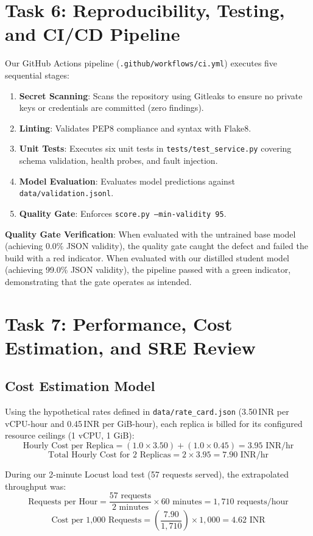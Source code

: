 \documentclass[10pt,a4paper]{article}
\begin{document}
\section{Task 6: Reproducibility, Testing, and CI/CD Pipeline}
Our GitHub Actions pipeline (\texttt{.github/workflows/ci.yml}) executes five sequential stages:
\begin{enumerate}
    \item \textbf{Secret Scanning}: Scans the repository using Gitleaks to ensure no private keys or credentials are committed (zero findings).
    \item \textbf{Linting}: Validates PEP8 compliance and syntax with Flake8.
    \item \textbf{Unit Tests}: Executes six unit tests in \texttt{tests/test\_service.py} covering schema validation, health probes, and fault injection.
    \item \textbf{Model Evaluation}: Evaluates model predictions against \texttt{data/validation.jsonl}.
    \item \textbf{Quality Gate}: Enforces \texttt{score.py --min-validity 95}. 
\end{enumerate}
\noindent\textbf{Quality Gate Verification}: When evaluated with the untrained base model (achieving 0.0\% JSON validity), the quality gate caught the defect and failed the build with a red indicator. When evaluated with our distilled student model (achieving 99.0\% JSON validity), the pipeline passed with a green indicator, demonstrating that the gate operates as intended.

\section{Task 7: Performance, Cost Estimation, and SRE Review}
\subsection{Cost Estimation Model}
Using the hypothetical rates defined in \texttt{data/rate\_card.json} (3.50\,INR per vCPU-hour and 0.45\,INR per GiB-hour), each replica is billed for its configured resource ceilings (1 vCPU, 1 GiB):
$$\text{Hourly Cost per Replica} = (1.0 \times 3.50) + (1.0 \times 0.45) = 3.95\text{ INR/hr}$$
$$\text{Total Hourly Cost for 2 Replicas} = 2 \times 3.95 = 7.90\text{ INR/hr}$$

During our 2-minute Locust load test (57 requests served), the extrapolated throughput was:
$$\text{Requests per Hour} = \frac{57\text{ requests}}{2\text{ minutes}} \times 60\text{ minutes} = 1,710\text{ requests/hour}$$
$$\text{Cost per 1,000 Requests} = \left(\frac{7.90}{1,710}\right) \times 1,000 = 4.62\text{ INR}$$
\end{document}
